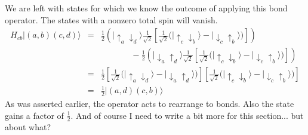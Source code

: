 We are left with states for which we know the outcome of applying this bond operator.
The states with a nonzero total spin will vanish.
\begin{eqnarray}
H_{cb}\lvert(a,b)(c,d)\rangle &=&
	     \tfrac{1}{2}\left( \lvert\uparrow_a \downarrow_d \rangle 
	     \tfrac{1}{ \sqrt{2}} \left[ 
	     	\tfrac{1}{ \sqrt{2}} \big(
	     	\lvert \uparrow_c \downarrow_b \rangle - \lvert \downarrow_c \uparrow_b \rangle 
	     \big)
	     \right]
	     \right) \nonumber \\    
	   && \;\; \;\;\;\;\;\; \;\;\;\;\;
	    - 	     \tfrac{1}{2} \left( \lvert\downarrow_a \uparrow_d \rangle 
	     \tfrac{1}{ \sqrt{2}} \left[ 
	     	\tfrac{1}{ \sqrt{2}} \big(
	     	\lvert \uparrow_c \downarrow_b \rangle - \lvert \downarrow_c \uparrow_b \rangle 
	     \big)
	     \right]
	     \right) \nonumber \\
	     &=&  \tfrac{1}{2} \left[ \tfrac{1}{ \sqrt{2}} 
	     \big( \lvert\uparrow_a \downarrow_d \rangle - \lvert\downarrow_a \uparrow_d \rangle  
	     \big)\right]
	     \left[ \tfrac{1}{ \sqrt{2}} 
	     \big( \lvert\uparrow_c \downarrow_b \rangle - \lvert\downarrow_c \uparrow_b \rangle  
	     \big)\right] \\
	     &=& \tfrac{1}{2} \lvert(a,d)(c,b)\rangle \nonumber
\end{eqnarray}
As was asserted earlier, the operator acts to rearrange to bonds.
Also the state gains a factor of $\frac{1}{2}$.
{\color{red} And of course I need to write a bit more for this section... but about what?}


